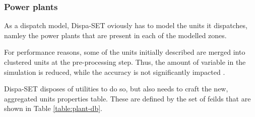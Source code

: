 \subsubsection{Power plants}

As a dispatch model, Dispa-SET oviously has to model the units it dispatches, namley the power plants that are present in each of the modelled zones.

For performance reasons, some of the units initially described are merged into clustered units at the pre-processing step. Thus, the amount of variable in the simulation is reduced, while the accuracy is not significantly impacted \cite{dispaset}.

Dispa-SET disposes of utilities to do so, but also needs to craft the new, aggregated units properties table. These are defined by the set of feilds that are shown in Table \ref{table:plant-db}.

